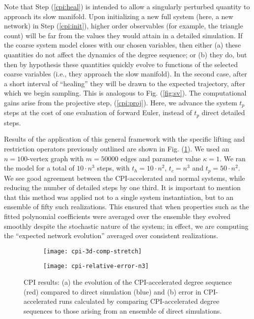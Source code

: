   Note that Step (\ref{cpi:heal}) is intended to allow a singularly
  perturbed quantity to approach its slow manifold.
  Upon initializing a new full system (here, a new network) in Step
  (\ref{cpi:init}), higher order observables (for example, the
  triangle count) will be far from the values they would attain in a
  detailed simulation.
  If the coarse system model closes with our chosen variables, then
  either (a) these quantities do not affect the dynamics of the degree
  sequence; or (b) they do, but then by hypothesis these quantities
  quickly evolve to functions of the selected coarse variables (i.e.,
  they approach the slow manifold).
  In the second case, after a short interval of ``healing'' they will
  be drawn to the expected trajectory, after which we begin sampling.
  This is analogous to Fig. (\ref{fig:sv}).
  The computational gains arise from the projective step,
  (\ref{cpi:proj}).
  Here, we advance the system $t_p$ steps at the cost of one
  evaluation of forward Euler, instead of $t_p$ direct detailed steps.

  Results of the application of this general framework with the
  specific lifting and restriction operators previously outlined are
  shown in Fig. (\ref{fig:cpi-results}). We used an $n=100$-vertex
  graph with $m=50000$ edges and parameter value $\kappa=1$. We ran
  the model for a total of $10 \cdot n^3$ steps, with
  $t_h = 10 \cdot n^2$, $t_c = n^3$ and $t_p = 50 \cdot n^2$.
  We see good agreement between the CPI-accelerated and normal
  systems, while reducing the number of detailed steps by one third.
  It is important to mention that this method was applied not to a
  single system instantiation, but to an ensemble of fifty such
  realizations.  This ensured that when properties such as the fitted
  polynomial coefficients were averaged over the ensemble they evolved
  smoothly despite the stochastic nature of the system; in effect, we
  are computing the ``expected network evolution'' averaged over
  consistent realizations.

  \begin{figure}
    \vspace{-5mm} \centering
    \begin{subfigure}{0.59\textwidth}
      \centering
      \texttt{[image: cpi-3d-comp-stretch]}
      \subcaption{\label{fig:cpi-error}}
    \end{subfigure} %
    \begin{subfigure}{0.39\textwidth}
      \centering
      \texttt{[image: cpi-relative-error-n3]}
      \subcaption{\label{fig:self-error}}
    \end{subfigure}%
    \caption[Coarse-projective integration results]{CPI results: (a)
      the evolution of the CPI-accelerated degree sequence (red)
      compared to direct simulation (blue) and (b) error in
      CPI-accelerated runs calculated by comparing CPI-accelerated
      degree sequences to those arising from an ensemble of direct
      simulations. \label{fig:cpi-results}}
  \end{figure}


